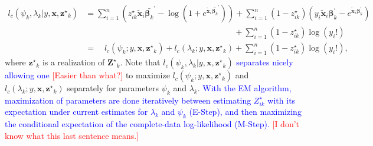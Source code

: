 \documentclass[11pt,letterpaper]{article}
\numberwithin{equation}{section}
\numberwithin{equation}{section}
\numberwithin{equation}{section}
\newcommand{\xTilda}{\tilde{\bm{x}}}
\newcommand{\zZ}{Z^\star}
\newcommand{\zz}{z^\star}
\begin{document}
\begin{equation*}\begin{split}
l_c(\psi_k,\lambda_k|y,\bm{x},{\bm{\zz}_k}) &= \sum_{i=1}^n \left( \zz_{ik}\xTilda_i \bar{\bm{\beta}_k }^{'} - \log\left(1+ e^{ \xTilda_i \bar{\bm{\beta}_k }^{'}}\right) \right) + \sum_{i=1}^n (1-\zz_{ik}) (y_i \xTilda_i \bm{\beta}_k^{'}  - e^{\xTilda_i \bm{\beta}_k^{'}})\\& \qquad\qquad\qquad\qquad\qquad\qquad\qquad\qquad\qquad+ \sum_{i=1}^n (1-\zz_{ik})\log(y_i!)\\
&= \quad l_c(\psi_k;y,\bm{x},{{\bm{\zz}_k}}) + l_c(\lambda_k; y,\bm{x},{{\bm{\zz}_k}}) + \sum_{i=1}^n (1- \zz_{ik})\log(y_i!), %
\end{split}\end{equation*}
where $\bm{\zz}_k$ is a realization of $\bm{\zZ}_k$. Note that $l_c(\psi_k,\lambda_k|y,\bm{x},\bm{\zz}_k)$  \textcolor{blue}{separates nicely allowing one} \textcolor{red}{[Easier than what?]} to maximize  $l_c(\psi_k; y,\bm{x},\bm{\zz}_k) $ and $l_c(\lambda_k; y,\bm{x},\bm{\zz}_k) $ separately for parameters $\psi_k$ and $\lambda_k$. \textcolor{blue}{With the EM algorithm, maximization of parameters are done iteratively between estimating $\zZ_{ik}$ with its expectation under current estimates for $\lambda_k$ and $\psi_k$ (E-Step), and then maximizing the conditional expectation of the complete-data log-likelihood (M-Step). } \textcolor{red}{[I don't know what this last sentence means.]}

\end{document}
